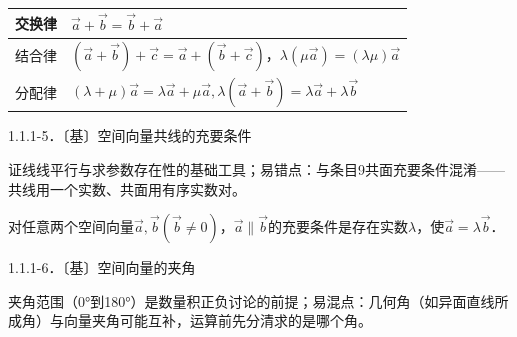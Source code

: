 \begin{table}[!t]\centering\begin{tabular}{@{}
  >{\raggedright\arraybackslash}p{}
  >{\raggedright\arraybackslash}p{}@{}}
\toprule
\begin{minipage}[b]{\linewidth}\raggedright
交换律
\end{minipage} & \begin{minipage}[b]{\linewidth}\raggedright
\(\overrightarrow{a} + \overrightarrow{b} =\)\(\overrightarrow{b} + \overrightarrow{a}\)
\end{minipage} \\
\midrule
结合律 &
\(\left( \overrightarrow{a} + \overrightarrow{b} \right) + \overrightarrow{c} =\)\(\overrightarrow{a} + \left( \overrightarrow{b} + \overrightarrow{c} \right)\)，\(\lambda(\mu\overrightarrow{a}) =\)\((\lambda\mu)\overrightarrow{a}\) \\
分配律 &
\((\lambda + \mu)\overrightarrow{a} = \lambda\overrightarrow{a} + \mu\overrightarrow{a},\lambda(\overrightarrow{a} + \overrightarrow{b}) =\)\(\lambda\overrightarrow{a} + \lambda\overrightarrow{b}\) \\
\bottomrule
\end{tabular}\end{table}

1.1.1-5．〔基〕空间向量共线的充要条件

证线线平行与求参数存在性的基础工具；易错点：与条目9共面充要条件混淆------共线用一个实数、共面用有序实数对。

对任意两个空间向量\(\overrightarrow{a},\overrightarrow{b}(\overrightarrow{b} \neq 0)\)，\(\overrightarrow{a} \parallel \overrightarrow{b}\)的充要条件是存在实数\(\lambda\)，使\(\overrightarrow{a} = \lambda\overrightarrow{b}\)．

1.1.1-6．〔基〕空间向量的夹角

夹角范围（0°到180°）是数量积正负讨论的前提；易混点：几何角（如异面直线所成角）与向量夹角可能互补，运算前先分清求的是哪个角。

